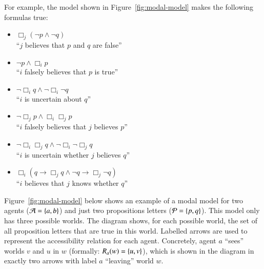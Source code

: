 \documentclass[nobib,nofonts]{tufte-handout}
\newcommand{\ra}{\ensuremath{\rightarrow}}
\newcommand{\Bel}{\ensuremath{\Box}}
\begin{document}
For example, the model shown in Figure~\ref{fig:modal-model} makes the following formulas true:
\begin{itemize}[]
  \item $\Bel_j (\neg p \wedge \neg q)$  \\ ``$j$ believes that $p$ and $q$ are false''
  \item $\neg p \wedge \Bel_i p$  \\ ``$i$ falsely believes that $p$ is true''
  \item $\neg \Bel_i q \wedge \neg \Bel_i \neg q$ \\ ``$i$ is uncertain about $q$''
  \item $\neg \Bel_j p \wedge \Bel_i \Bel_j p$ \\ ``$i$ falsely believes that $j$ believes $p$''
  \item $\neg \Bel_i \Bel_j q \wedge \neg \Bel_i \neg \Bel_j q$ \\ ``$i$ is uncertain whether $j$ believes $q$''
  \item $\Bel_i (q \ra \Bel_j q \wedge \neg q \ra \Bel_j \neg q)$ \\ ``$i$ believes that $j$ knows whether $q$''
\end{itemize}

Figure~\ref{fig:modal-model} below shows an example of a modal model for two agents ($\mathcal{A} = \left\{a,b\right\}$) and just two propositions letters ($\mathcal{P} = \left\{p, q\right\}$).
This model only has three possible worlds.
The diagram shows, for each possible world, the set of all proposition letters that are true in this world.
Labelled arrows are used to represent the accessibility relation for each agent.
Concretely, agent $a$ ``sees'' worlds $v$ and $u$ in $w$ (formally: $R_{a}(w) = \left\{u,v\right\}$), which is shown in the diagram in exactly two arrows with label $a$ ``leaving'' world $w$.
\end{document}
